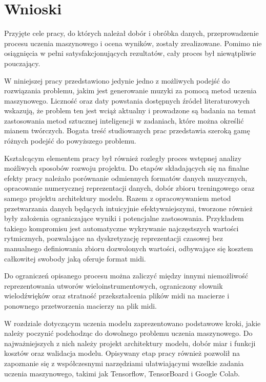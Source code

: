 \chapter{Wnioski}\label{chap:concl}
{
    
    Przyjęte cele pracy, do których należał dobór i obróbka danych, 
    przeprowadzenie procesu uczenia maszynowego i ocena wyników, zostały zrealizowane. Pomimo nie osiągnięcia w pełni satysfakcjonujących rezultatów, cały proces był niewątpliwie pouczający. 

    W niniejszej pracy przedstawiono jedynie jedno z możliwych podejść do rozwiązania problemu,
    jakim jest generowanie muzyki za pomocą metod uczenia maszynowego. 
    Liczność oraz daty powstania dostępnych źródeł literaturowych wskazują, że problem ten jest wciąż aktualny 
    i prowadzone są badania na temat zastosowania metod sztucznej inteligencji w zadaniach, 
    które można określić mianem twórczych. Bogata treść studiowanych prac przedstawia szeroką gamę 
    różnych podejść do powyższego problemu.

    Kształcącym elementem pracy był również rozległy proces wstępnej analizy możliwych sposobów
    rozwoju projektu. Do etapów składających się na finalne efekty pracy należało porównanie odmiennych 
    formatów danych muzycznych, opracowanie numerycznej reprezentacji danych, dobór zbioru treningowego
    oraz samego projektu architektury modelu. 
    Razem z opracowywaniem metod przetwarzania danych będących intuicyjnie efektywniejszymi, tworzone również były założenia
    ograniczające wyniki i potencjalne zastosowania. Przykładem takiego kompromisu jest automatyczne wykrywanie
    najczęstszych wartości rytmicznych, pozwalające na dyskretyzację reprezentacji czasowej bez
    manualnego definiowania zbioru dozwolonych wartości, odbywające się kosztem całkowitej swobody jaką oferuje format midi.
    
    Do ograniczeń opisanego procesu można zaliczyć między innymi niemożliwość reprezentowania utworów wieloinstrumentowych, 
    ograniczony słownik wielodźwięków oraz stratność przekształcenia plików midi na macierze i ponownego przetworzenia
    macierzy na plik midi.

    W rozdziale dotyczącym uczenia modelu zaprezentowano podstawowe kroki, jakie należy poczynić podchodząc do
    dowolnego problemu uczenia maszynowego. Do najważniejszych z nich należy projekt architektury modelu,
    dobór miar i funkcji kosztów oraz walidacja modelu. Opisywany etap pracy również pozwolił na zapoznanie 
    się z współczesnymi narzędziami ułatwiającymi wszelkie zadania uczenia maszynowego, takimi jak Tensorflow, 
    TensorBoard i Google Colab. 

}
